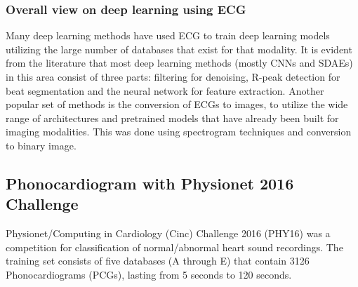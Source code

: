\documentclass[journal]{IEEEtran}
\begin{document}
\subsubsection{Overall view on deep learning using ECG}
Many deep learning methods have used ECG to train deep learning models utilizing the large number of databases that exist for that modality.
It is evident from the literature that most deep learning methods (mostly CNNs and SDAEs) in this area consist of three parts: filtering for denoising, R-peak detection for beat segmentation and the neural network for feature extraction.
Another popular set of methods is the conversion of ECGs to images, to utilize the wide range of architectures and pretrained models that have already been built for imaging modalities.
This was done using spectrogram techniques\cite{luo2017patient, xia2018detecting} and conversion to binary image\cite{xiao2018monitoring, liu2018detecting, isin2017cardiac}.

\subsection{Phonocardiogram with Physionet 2016 Challenge}
Physionet/Computing in Cardiology (Cinc) Challenge 2016 (PHY16) was a competition for classification of normal/abnormal heart sound recordings.
The training set consists of five databases (A through E) that contain 3126 Phonocardiograms (PCGs), lasting from 5 seconds to 120 seconds.
\end{document}
